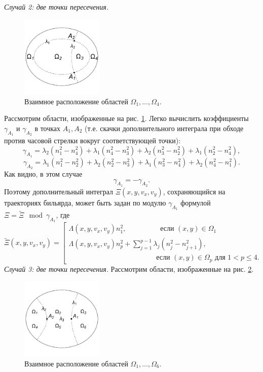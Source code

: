 \bigskip
\textit{ Случай 2: две точки пересечения.}
\begin{figure}[!htb]
\centering
   \includegraphics[width=0.35\textwidth]{images/ch4/section1/img3.pdf}   
    \caption{Взаимное расположение областей $\Omega_1, \ldots, \Omega_4$.}
    \label{fig:pt8:_example7}
\end{figure}
Рассмотрим области, изображенные на рис. \ref{fig:pt8:_example7}. 
Легко вычислить коэффициенты $\gamma_{A_1}$ и $\gamma_{A_2}$ в точках $A_1, A_2$ (т.е. скачки дополнительного интеграла при обходе против часовой стрелки вокруг соответствующей точки):
$$\gamma_{A_1} = \lambda_2(n_1^2 - n_4^2) + \lambda_1(n_4^2-n_3^2) + \lambda_2(n_3^2-n_2^2) + \lambda_1(n_2^2-n_4^2), $$
$$\gamma_{A_2} = \lambda_1(n_1^2 - n_2^2) + \lambda_2(n_2^2-n_3^2) + \lambda_1(n_3^2-n_4^2) + \lambda_2(n_4^2-n_1^2). $$
Как видно, в этом случае $$\gamma_{A_1} = -\gamma_{A_2}.$$
Поэтому дополнительный интеграл $\Xi(x, y, v_x, v_y)$, сохраняющийся на траекториях бильярда, может быть задан по модулю $\gamma_{A_1}$ формулой $\Xi = \widetilde{\Xi} \mod \gamma_{A_1}$, где 
\begin{equation*}
\widetilde{\Xi}(x, y, v_x, v_y) = \left[
\begin{array}{ll}
    \Lambda(x, y, v_x, v_y) n_1^2,  \qquad \ \  \qquad  \text{ если } (x,y) \in \Omega_1 
    \\
    \Lambda(x, y, v_x, v_y) n_p^2 + 
    \sum_{j=1}^{p-1} \lambda_j(n_j^2-n_{j+1}^2), \\
     \qquad \qquad  \qquad \qquad  \qquad \qquad \text{ если } (x,y) \in \Omega_p \text{ для } 1 < p \leq 4. 
\end{array}
\right.
\end{equation*}
 \medskip
\textit{ Случай 3: две точки пересечения.}
Рассмотрим области, изображенные на рис. \ref{fig:pt8:_example8}. 
\begin{figure}[!htb]
\centering
   \includegraphics[width=0.35\textwidth]{images/ch4/section1/img4.pdf}   
    \caption{Взаимное расположение областей $\Omega_1, \ldots, \Omega_6$.}
    \label{fig:pt8:_example8}
\end{figure}


